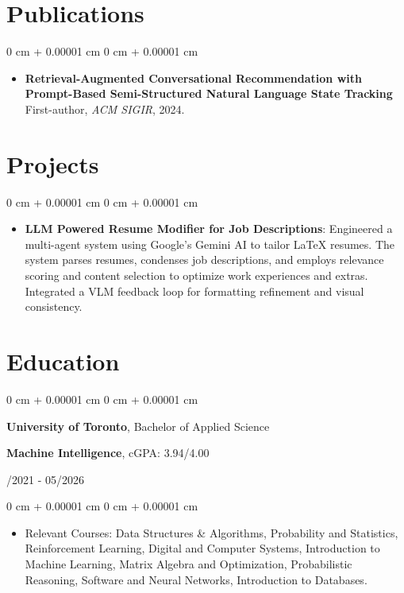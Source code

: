\documentclass[10pt, letterpaper]{article}
\newenvironment{highlights}{
    \begin{itemize}[
        topsep=0.10 cm,
        parsep=0.10 cm,
        partopsep=0pt,
        itemsep=0pt,
        leftmargin=0 cm + 10pt
    ]
}{
    \end{itemize}
}
\newenvironment{onecolentry}{
    \begin{adjustwidth}{
        0 cm + 0.00001 cm
    }{
        0 cm + 0.00001 cm
    }
}{
    \end{adjustwidth}
}
\newenvironment{twocolentry}[2][]{
    \onecolentry
    \def\secondColumn{#2}
    \setcolumnwidth{\fill, 4.5 cm}
    \begin{paracol}{2}
}{
    \switchcolumn \raggedleft \secondColumn
    \end{paracol}
    \endonecolentry
}
\begin{document}
\section{Publications}
\begin{onecolentry}
    \begin{highlights}
    \item \textbf{Retrieval-Augmented Conversational Recommendation with Prompt-Based Semi-Structured Natural Language State Tracking} \\
    First-author, \textit{ACM SIGIR}, 2024. 
    \end{highlights}
\end{onecolentry}


\section{Projects}
\vspace{0.10 cm}
\begin{onecolentry}
    \begin{highlights}
        \item \textbf{LLM Powered Resume Modifier for Job Descriptions}: Engineered a multi-agent system using Google's Gemini AI to tailor LaTeX resumes. The system parses resumes, condenses job descriptions, and employs relevance scoring and content selection to optimize work experiences and extras. Integrated a VLM feedback loop for formatting refinement and visual consistency.
    \end{highlights}
\end{onecolentry}

\section{Education}
\vspace{0.08 cm}
\begin{twocolentry}{09/2021 - 05/2026}
    {\textbf{University of Toronto}}, Bachelor of Applied Science  
    \item \textbf{Machine Intelligence}, cGPA: {3.94}/4.00
\end{twocolentry}
\vspace{0.10 cm}
\begin{onecolentry}
    \begin{highlights}
        \item Relevant Courses: Data Structures \& Algorithms, Probability and Statistics, Reinforcement Learning, Digital and Computer Systems, Introduction to Machine Learning, Matrix Algebra and Optimization, Probabilistic Reasoning, Software and Neural Networks, Introduction to Databases.
    \end{highlights}
\end{onecolentry}
\end{document}
